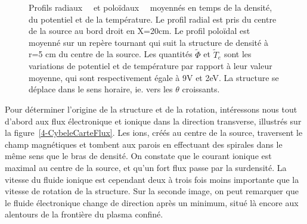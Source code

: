 \begin{refsection}
\begin{figure}[htbp]
  \centering
    \caption{Profils radiaux~~ et
    poloïdaux~~ moyennés en temps de la densité, du
    potentiel et de la température. Le profil radial est pris du centre de la source au bord droit
    en X=20cm. Le profil poloïdal est moyenné sur un repère tournant qui suit
    la structure de densité à r=5 cm du centre de la source. Les quantités
    $\tilde{\Phi}$ et $\tilde{T}_e$ sont les variations de potentiel et de température par rapport à leur valeur
    moyenne, qui sont respectivement égale à 9V et 2eV. La structure se déplace
    dans le sens horaire, ie. vers les $\theta$ croissants.}
    \label{4-CybeleProfils}
\end{figure}

Pour déterminer l'origine de la structure et de la rotation, intéressons nous
tout d'abord aux flux électronique et ionique dans la direction
transverse, illustrés sur la figure~\ref{4-CybeleCarteFlux}.
Les ions, créés au centre de la source, traversent le champ magnétiques et
tombent aux parois en effectuant des spirales dans le même sens que le bras de
densité. On constate que le courant ionique est maximal au centre de la source,
et qu'un fort flux passe par la surdensité. La vitesse du fluide ionique
est cependant deux à trois fois moins importante que la vitesse de rotation de
la structure. Sur la seconde image, on peut remarquer que le fluide électronique
change de direction après un minimum, situé là encore aux alentours de la
frontière du plasma confiné.


\end{refsection}
